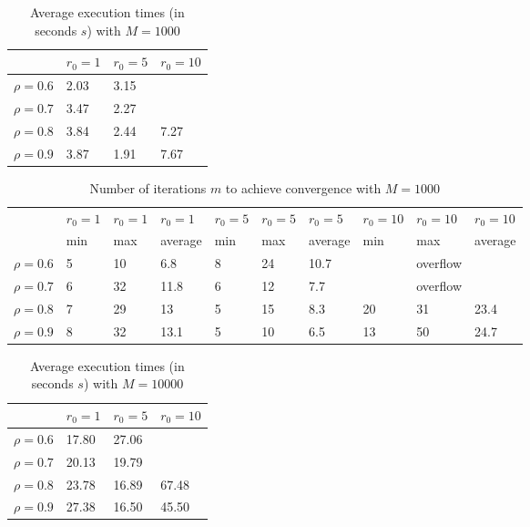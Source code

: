 \documentclass[a4paper,11pt,openright]{report}
\begin{document}
\begin{table}[H]
\centering
\addtolength{\leftskip}{-1.5cm}
\addtolength{\rightskip}{-1.5cm}
\begin{tabular}{|c|lll|}
\hline
$ $ & $r_0 = 1$ & $r_0 = 5$ & $r_0 = 10$ \\
\hline
$\rho = 0.6$ & 2.03 & 3.15 &  \\

$\rho = 0.7$ & 3.47 & 2.27 &  \\

$\rho = 0.8$ & 3.84 & 2.44 & 7.27 \\

$\rho = 0.9$ & 3.87 & 1.91 & 7.67 \\
\hline
\end{tabular}
\caption{Average execution
 times (in seconds $s$) with $M = 1000$}
\end{table}
\begin{table}[H]
\centering
\addtolength{\leftskip}{-1.5cm}
\addtolength{\rightskip}{-1.5cm}
\begin{tabular}{|c|lllllllll|}
\hline
$ $ & $r_0 = 1$ & $r_0 = 1$ & $r_0 = 1$ & $r_0 = 5$ & $r_0 = 5$ & $r_0 = 5$ & $r_0 = 10$ & $r_0 = 10$ & $r_0 = 10$  \\
$ $ & min & max & average & min & max & average & min & max & average \\ 
\hline
$\rho = 0.6$ & 5 & 10 & 6.8 & 8 & 24 & 10.7 &  & overflow &  \\

$\rho = 0.7$ & 6 & 32 & 11.8 & 6 & 12 & 7.7 &  & overflow &  \\

$\rho = 0.8$ & 7 & 29 & 13 & 5 & 15 & 8.3 & 20 & 31 & 23.4 \\

$\rho = 0.9$ & 8 & 32 & 13.1 & 5 & 10 & 6.5 & 13 & 50 & 24.7\\
\hline
\end{tabular}
\caption{Number of iterations $m$ to achieve convergence with $M = 1000$}
\end{table}
\begin{table}[H]
\centering
\addtolength{\leftskip}{-1.5cm}
\addtolength{\rightskip}{-1.5cm}
\begin{tabular}{|c|lll|}
\hline
$ $ & $r_0 = 1$ & $r_0 = 5$ & $r_0 = 10$ \\
\hline
$\rho = 0.6$ & 17.80 & 27.06 &  \\

$\rho = 0.7$ & 20.13 & 19.79 &  \\

$\rho = 0.8$ & 23.78 & 16.89 & 67.48 \\

$\rho = 0.9$ & 27.38 & 16.50 & 45.50 \\
\hline
\end{tabular}
\caption{Average execution
 times (in seconds $s$) with $M = 10000$}
\end{table}
\end{document}
